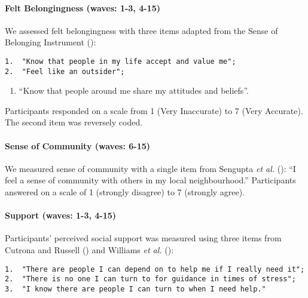 \documentclass[
  singlecolumn,
  9pt]{article}
\let\oldparagraph\paragraph
\renewcommand{\paragraph}[1]{\oldparagraph{#1}\mbox{}}
\providecommand{\tightlist}{%
  \setlength{\itemsep}{0pt}\setlength{\parskip}{0pt}}\usepackage{longtable,booktabs,array}
\begin{document}
\paragraph{Felt Belongingness (waves: 1-3,
4-15)}\label{felt-belongingness-waves-1-3-4-15}

We assessed felt belongingness with three items adapted from the Sense
of Belonging Instrument ():

\begin{verbatim}
1.  "Know that people in my life accept and value me";
2.  "Feel like an outsider";
\end{verbatim}

\begin{enumerate}
\def\labelenumi{\arabic{enumi}.}
\setcounter{enumi}{2}
\tightlist
\item
  ``Know that people around me share my attitudes and beliefs''.
\end{enumerate}

Participants responded on a scale from 1 (Very Inaccurate) to 7 (Very
Accurate). The second item was reversely coded.

\paragraph{Sense of Community (waves:
6-15)}\label{sense-of-community-waves-6-15}

We measured sense of community with a single item from Sengupta \emph{et
al.} (): ``I feel a sense of community
with others in my local neighbourhood.'' Participants answered on a
scale of 1 (strongly disagree) to 7 (strongly agree).

\paragraph{Support (waves: 1-3, 4-15)}\label{support-waves-1-3-4-15}

Participants' perceived social support was measured using three items
from Cutrona and Russell () and Williams
\emph{et al.} ():

\begin{verbatim}
1.  "There are people I can depend on to help me if I really need it";
2.  "There is no one I can turn to for guidance in times of stress";
3.  "I know there are people I can turn to when I need help." 
\end{verbatim}
\end{document}
